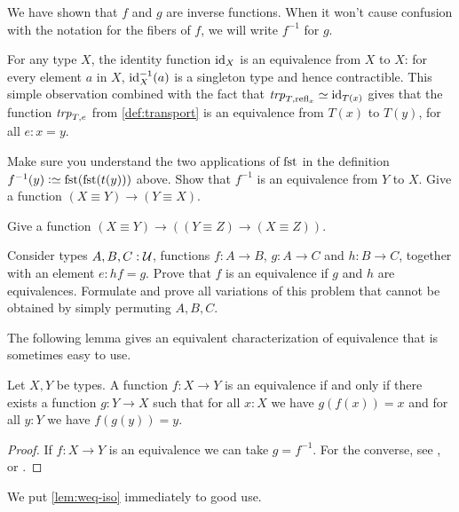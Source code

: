 We have shown that $f$ and $g$ are inverse functions.  When it won't cause confusion with the notation for the fibers of $f$, we will write
$f^{-1}$ for $g$.

For any type $X$, the identity function $\mathord{\mathrm{id}}_X$ is an
equivalence from $X$ to $X$: for every element $a$ in $X$,
$\mathord{\mathrm{id}}_X^{-1}(a)$ is a singleton type and hence contractible.
This simple observation combined with the fact that
$\trp[T]{\refl{x}}\jdeq \id_{T(x)}$ gives that
the function $\trp[T]{e}$ from \cref{def:transport}
is an equivalence from $T(x)$ to $T(y)$, for all $e: x=y$.

\begin{xca}\label{xca:equivalence-invers}
Make sure you understand the two applications of $\fst$
in the definition $f^{-1}(y)\defeq\fst(\fst(t(y)))$ above.
Show that $f^{-1}$ is an equivalence from $Y$ to $X$.
Give a function $(X\equiv Y) \to (Y\equiv X)$.
\end{xca}

\begin{xca}\label{xca:equivalence-comp}
Give  a function $(X\equiv Y) \to ((Y\equiv Z) \to (X\equiv Z))$.
\end{xca}

\begin{xca}\label{xca:2-out-of-3}
Consider types $A,B,C:{\mathcal{U}}$, functions $f:A\to B$, $g:A\to C$
and $h:B\to C$, together with an element $e: hf=g$. 
Prove that $f$ is an equivalence if $g$ and $h$ are equivalences.
Formulate and prove all variations of this problem that
cannot be obtained by simply permuting $A,B,C$.
\end{xca}

The following lemma gives an equivalent characterization
of equivalence that is sometimes easy to use.

\begin{lemma}\label{lem:weq-iso}
Let $X,Y$ be types. A function $f: X\to Y$ is an equivalence
if and only if there exists a function $g: Y\to X$ such that
for all $x:X$ we have $g(f(x))=x$ and for all 
$y:Y$ we have $f(g(y))=y$.
\end{lemma}
\begin{proof}
If $f: X\to Y$ is an equivalence we can take $g=f^{-1}$.
For the converse, see
\cite[Chapter 4]{hottbook}, or .
\end{proof}

We put \cref{lem:weq-iso} immediately to good use.

